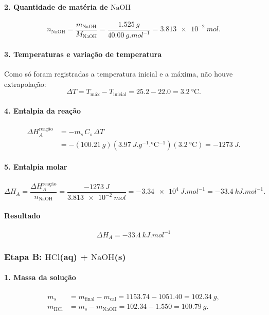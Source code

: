 \paragraph{2. Quantidade de matéria de $\mathrm{NaOH}$}
\[
n_{\mathrm{NaOH}}=\frac{m_{\mathrm{NaOH}}}{M_{\mathrm{NaOH}}}
=\frac{\SI{1,525}{g}}{\SI{40,00}{g.mol^{-1}}}
=\SI{3,813e-2}{mol}.
\]

\paragraph{3. Temperaturas e variação de temperatura}
Como só foram registradas a temperatura inicial e a máxima, não houve extrapolação:
\[
\Delta T = T_{\text{máx}} - T_{\text{inicial}} = \num{25,2} - \num{22,0} = \SI{3,2}{\degreeCelsius}.
\]

\paragraph{4. Entalpia da reação}
\[
\begin{aligned}
\Delta H_A^{\text{reação}}&=-m_s\,C_s\,\Delta T
\\
&=-\left(\SI{100,21}{g}\right)\left(\SI{3,97}{J.g^{-1}.\degreeCelsius^{-1}}\right)\left(\SI{3,2}{\degreeCelsius}\right)
=\SI{-1273}{J}.
\end{aligned}
\]

\paragraph{5. Entalpia molar}
\[
\Delta H_A=\frac{\Delta H_A^{\text{reação}}}{n_{\mathrm{NaOH}}}
=\frac{\SI{-1273}{J}}{\SI{3,813e-2}{mol}}
=\SI{-3,34e4}{J.mol^{-1}}
=\SI{-33,4}{kJ.mol^{-1}}.
\]

\paragraph{Resultado}
\[
\boxed{\Delta H_A=\SI{-33,4}{kJ.mol^{-1}}}
\]

\subsubsection{Etapa B: $\mathrm{HCl}$(aq) + $\mathrm{NaOH}$(s)}

\paragraph{1. Massa da solução}
\[
\begin{aligned}
m_s &= m_{\text{final}} - m_{\text{cal}} = \num{1153,74} - \num{1051,40} = \SI{102,34}{g},\\
m_{\mathrm{HCl}} &= m_s - m_{\mathrm{NaOH}} = \num{102,34} - \num{1,550} = \SI{100,79}{g}.
\end{aligned}
\]

